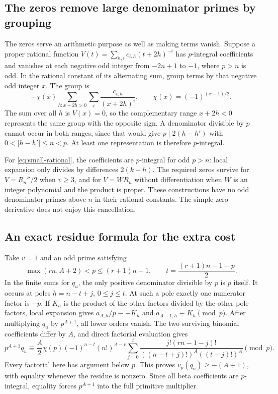 \subsection{The zeros remove large denominator primes by grouping}

The zeros serve an arithmetic purpose as well as making terms vanish.
Suppose a proper rational function
$V(t)=\sum_{h,i}c_{i,h}(t+2h)^{-i}$ has $p$-integral coefficients
and vanishes at each negative odd integer from $-2n+1$ to $-1$,
where $p>n$ is odd. In the rational constant of its alternating sum,
group terms by that negative odd integer $x$. The group is
\[
 -\chi(x)\sum_{h:x+2h>0}\sum_i\frac{c_{i,h}}{(x+2h)^i},
 \qquad \chi(x)=(-1)^{(x-1)/2}.
\]
The sum over all $h$ is $V(x)=0$, so the complementary range
$x+2h<0$ represents the same group with the opposite sign.
A denominator divisible by $p$ cannot occur in both ranges, since
that would give $p\mid2(h-h')$ with $0<|h-h'|\le n<p$.
At least one representation is therefore $p$-integral.

For \eqref{eq:small-rational}, the coefficients are $p$-integral for
odd $p>n$: local expansion only divides by differences $2(k-h)$.
The required zeros survive for $V=R_n''/2$ when $v\ge3$, and for
$V=WR_n$ without differentiation when $W$ is an integer polynomial
and the product is proper. These constructions have no odd denominator
primes above $n$ in their rational constants. The simple-zero derivative
does not enjoy this cancellation.

\subsection{An exact residue formula for the extra cost}

Take $v=1$ and an odd prime satisfying
\[
 \max(rn,A+2)<p\le(r+1)n-1,\qquad
 t=\frac{(r+1)n-1-p}{2}.
\]
In the finite sums for $q_u$, the only positive denominator divisible
by $p$ is $p$ itself. It occurs at poles $h=n-t+j$, $0\le j\le t$.
At such a pole exactly one numerator factor is $-p$. If $K_h$ is
the product of the other factors divided by the other pole factors,
local expansion gives
$a_{A,h}/p\equiv-K_h$ and $a_{A-1,h}\equiv K_h\pmod p$.
After multiplying $q_u$ by $p^{A+1}$, all lower orders vanish.
The two surviving binomial coefficients differ by $A$, and direct
factorial evaluation gives
\begin{equation}\label{eq:tail-residue}
 p^{A+1}q_u\equiv
 \frac A2\chi(p)(-1)^{n-t}(n!)^{A-r}
 \sum_{j=0}^t\frac{j!(rn-1-j)!}
 {((n-t+j)!)^A((t-j)!)^A}\pmod p.
\end{equation}
Every factorial here has argument below $p$. This proves
$v_p(q_u)\ge-(A+1)$, with equality whenever the residue is nonzero.
Since all beta coefficients are $p$-integral, equality forces
$p^{A+1}$ into the full primitive multiplier.

